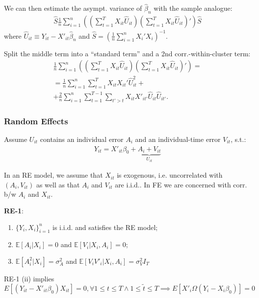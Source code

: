 \documentclass[9pt]{extarticle}
\newcommand{\EE}{\mathbb{E}}
\newcommand{\hbeta}{\hat{\beta}}
\begin{document}
\begin{multicols*}{4}
We can then estimate the asympt. variance of $\hbeta_n$ with the sample analogue:
\begin{gather*}
\hat{S}\frac{1}{n}\sum_{i=1}^{n}\left((\sum_{t=1}^{T}X_{it}\hat{U}_{it})(\sum_{t=1}^{T}X_{it}\hat{U}_{it})'\right)\hat{S}
\end{gather*}
where $\hat{U}_{it}\equiv Y_{it}-X'_{it}\hat{\beta}_{n}$ and $\hat{S} = \left(\frac{1}{n}\sum_{i=1}^{n}X_{i}'X_{i}\right) ^{-1}$.

\vbox{Split the middle term into a ``standard term'' and a 2nd corr.-within-cluster term:
\begin{gather*}
\frac{1}{n}\sum_{i=1}^{n}\left((\sum_{t=1}^{T}X_{it}\hat{U}_{it})(\sum_{t=1}^{T}X_{it}\hat{U}_{it})'\right) = \\
= \frac{1}{n} \sum_{i=1}^n \sum_{t=1}^T X_{it} X_{it}' \hat{U}_{it}^2 + \\
+ \frac{2}{n}\sum_{i=1}^n \sum_{t=1}^{T-1} \sum_{t' > t} X_{it} X'_{it'} \hat{U}_{it} \hat{U}_{it'}.
\end{gather*}}

\subsubsection*{Random Effects}
Assume $U_{it}$ contains an individual error $A_{i}$ and an individual-time error $V_{it}$, s.t.:
\begin{gather*}
    Y_{it}=X'_{it}\beta_{0}+\underset{U_{it}}{\underbrace{A_{i}+V_{it}}}
\end{gather*}

In an RE model, we assume that $X_{it}$ is exogenous, i.e. uncorrelated with $(A_{i}, V_{it})$ as well as that $A_{i}$ and $V_{it}$ are i.i.d.. In FE  we are concerned with corr. b/w $A_{i}$ and $X_{it}$.





\textbf{RE-1}:
\begin{enumerate}[label=(\roman*)]
    \item $\{Y_{i},X_{i}\}_{i=1}^{n}$ is i.i.d. and satisfies the RE model;
    \item $\EE\left[A_{i}|X_{i}\right]=0$ and $\EE[V_{i}|X_{i},A_{i}]=0$; 
    \item $\EE[A_{i}^{2}|X_{i}]=\sigma_{A}^{2}$ and $\EE[V_{i}V'_{i}|X_{i},A_{i}]=\sigma_{V}^{2}I_{T}$
\end{enumerate}

RE-1 (ii) implies $E\left[\left(Y_{it}-X'_{it}\beta_{0}\right)X_{it}\right]=0,\forall1\leq t\leq T\land1\leq\tilde{t}\leq T\implies E\left[X'_{i}\Omega\left(Y_{i}-X_{i}\beta_{0}\right)\right]=0$


\end{multicols*}
\end{document}
